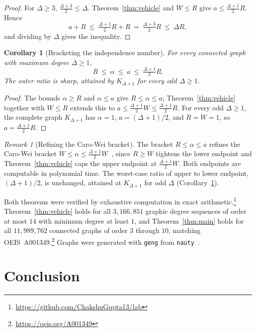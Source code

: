 \documentclass[11pt]{article}
\newtheorem{corollary}{Corollary}
\theoremstyle{remark}
\newtheorem{remark}{Remark}
\begin{document}
\begin{proof}
For $\Delta \ge 3$, $\tfrac{\Delta+3}{2} \le \Delta$. Theorem~\ref{thm:vehicle}
and $W \le R$ give $a \le \tfrac{\Delta+1}{2}R$. Hence
\[
  a + R \ \le\ \tfrac{\Delta+1}{2}R + R
        \ =\ \tfrac{\Delta+3}{2}R \ \le\ \Delta R,
\]
and dividing by $\Delta$ gives the inequality.
\end{proof}

\begin{corollary}[Bracketing the independence number]\label{cor:approx}
For every connected graph with maximum degree $\Delta \ge 1$,
\[
  R \ \le\ \alpha \ \le\ a \ \le\ \tfrac{\Delta+1}{2}R.
\]
The outer ratio is sharp, attained by $K_{\Delta+1}$ for every odd $\Delta \ge 1$.
\end{corollary}

\begin{proof}
The bounds $\alpha \ge R$ and $\alpha \le a$ give $R \le \alpha \le a$;
Theorem~\ref{thm:vehicle} together with $W \le R$ extends this to
$a \le \tfrac{\Delta+1}{2}W \le \tfrac{\Delta+1}{2}R$. For every odd $\Delta \ge 1$, the complete
graph $K_{\Delta+1}$ has $\alpha = 1$, $a = (\Delta+1)/2$, and $R = W = 1$, so
$a = \tfrac{\Delta+1}{2}R$.
\end{proof}

\begin{remark}[Refining the Caro-Wei bracket]
The bracket $R \le \alpha \le a$ refines the Caro-Wei bracket
$W \le \alpha \le \tfrac{\Delta+1}{2}W$~\cite{Boppana2018}, since
$R \ge W$ tightens the lower endpoint and
Theorem~\ref{thm:vehicle} caps the upper endpoint at $\tfrac{\Delta+1}{2}W$.
Both endpoints are computable in polynomial time. The worst-case ratio of
upper to lower endpoint, $(\Delta+1)/2$, is unchanged, attained at
$K_{\Delta+1}$ for odd $\Delta$ (Corollary~\ref{cor:approx}).
\end{remark}

Both theorems were verified by exhaustive computation in exact
arithmetic.\footnote{\url{https://github.com/ChakshuGupta13/lab}}
Theorem~\ref{thm:vehicle} holds for all $3{,}166{,}851$ graphic degree
sequences of order at most $14$ with minimum degree at least $1$, and
Theorem~\ref{thm:main} holds for all $11{,}989{,}762$ connected graphs of
order $3$ through $10$, matching OEIS~A001349.\footnote{\url{https://oeis.org/A001349}}
Graphs were generated with \texttt{geng} from \texttt{nauty}~\cite{McKay2014nauty}.

\section{Conclusion}\label{sec:disc}
\end{document}
